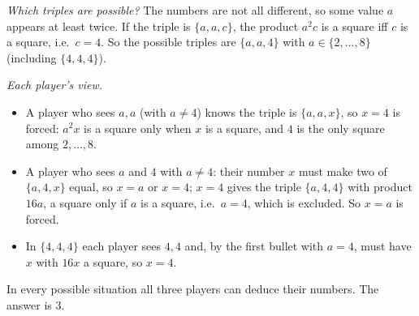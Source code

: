 \emph{Which triples are possible?} The numbers are not all different, so some value $a$ appears at least twice. If the triple is $\{a,a,c\}$, the product $a^2c$ is a square iff $c$ is a square, i.e.\ $c=4$. So the possible triples are $\{a,a,4\}$ with $a\in\{2,\dots,8\}$ (including $\{4,4,4\}$).

\emph{Each player's view.}
\begin{itemize}
\item A player who sees $a,a$ (with $a\ne4$) knows the triple is $\{a,a,x\}$, so $x=4$ is forced: $a^2x$ is a square only when $x$ is a square, and $4$ is the only square among $2,\dots,8$.
\item A player who sees $a$ and $4$ with $a\ne4$: their number $x$ must make two of $\{a,4,x\}$ equal, so $x=a$ or $x=4$; $x=4$ gives the triple $\{a,4,4\}$ with product $16a$, a square only if $a$ is a square, i.e.\ $a=4$, which is excluded. So $x=a$ is forced.
\item In $\{4,4,4\}$ each player sees $4,4$ and, by the first bullet with $a=4$, must have $x$ with $16x$ a square, so $x=4$.
\end{itemize}
In every possible situation all three players can deduce their numbers. The answer is $\boxed{3}$.
